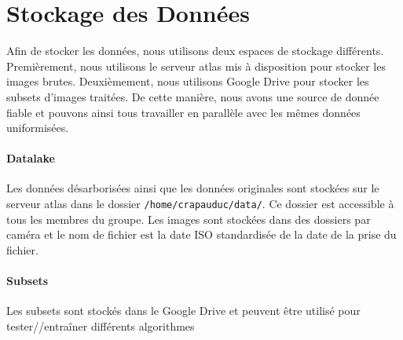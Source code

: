\section{Stockage des Données}

Afin de stocker les données, nous utilisons deux espaces de stockage différents. Premièrement, nous utilisons le serveur atlas mis à disposition pour stocker les images brutes. Deuxièmement, nous utilisons Google Drive pour stocker les subsets d'images traitées. De cette manière, nous avons une source de donnée fiable et pouvons ainsi tous travailler en parallèle avec les mêmes données uniformisées.

\paragraph*{Datalake}

Les données désarborisées ainsi que les données originales sont stockées sur le serveur atlas dans le dossier \texttt{/home/crapauduc/data/}. Ce dossier est accessible à tous les membres du groupe. Les images sont stockées dans des dossiers par caméra et le nom de fichier est la date ISO standardisée de la date de la prise du fichier.

\paragraph{Subsets}

Les subsets sont stockés dans le Google Drive et peuvent être utilisé pour tester//entraîner différents algorithmes



